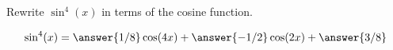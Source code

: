\documentclass{ximera}
\author{Bobby Ramsey}
\begin{document}
\begin{exercise}

	Rewrite $\sin^4(x)$ in terms of the cosine function.
	

	\[ \sin^4(x) = \answer{1/8} \cos(4x) + \answer{-1/2} \cos(2x) + \answer{3/8} \]

\end{exercise}
\end{document}
